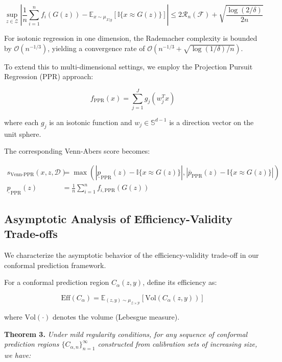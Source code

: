 \documentclass{article}
\theoremstyle{plain}
\theoremstyle{definition}
\theoremstyle{remark}
\begin{document}
\begin{equation}
\sup_{z \in \mathcal{Z}} \left| \frac{1}{n} \sum_{i=1}^n f_i(G(z)) - \mathbb{E}_{x \sim \mu_{\mathcal{X}|y}}[\mathbb{I}\{x \approx G(z)\}] \right| \leq 2\mathcal{R}_n(\mathcal{F}) + \sqrt{\frac{\log(2/\delta)}{2n}}
\end{equation}

For isotonic regression in one dimension, the Rademacher complexity is bounded by $\mathcal{O}(n^{-1/3})$, yielding a convergence rate of $\mathcal{O}(n^{-1/3} + \sqrt{\log(1/\delta)/n})$.

To extend this to multi-dimensional settings, we employ the Projection Pursuit Regression (PPR) approach:

\begin{equation}
f_{\text{PPR}}(x) = \sum_{j=1}^J g_j(w_j^T x)
\end{equation}

where each $g_j$ is an isotonic function and $w_j \in \mathbb{S}^{d-1}$ is a direction vector on the unit sphere.

The corresponding Venn-Abers score becomes:

\begin{align}
s_{\text{Venn-PPR}}(x, z, \mathcal{D}) &= \max(|\underline{p}_{\text{PPR}}(z) - \mathbb{I}\{x \approx G(z)\}|, |\overline{p}_{\text{PPR}}(z) - \mathbb{I}\{x \approx G(z)\}|) \\
\underline{p}_{\text{PPR}}(z) &= \frac{1}{n} \sum_{i=1}^n f_{i,\text{PPR}}(G(z))
\end{align}

\subsection{Asymptotic Analysis of Efficiency-Validity Trade-offs}

We characterize the asymptotic behavior of the efficiency-validity trade-off in our conformal prediction framework.

For a conformal prediction region $C_{\alpha}(z, y)$, define its efficiency as:

\begin{equation}
\text{Eff}(C_{\alpha}) = \mathbb{E}_{(z,y) \sim \mu_{\mathcal{Z} \times \mathcal{Y}}}[\text{Vol}(C_{\alpha}(z, y))]
\end{equation}

where $\text{Vol}(\cdot)$ denotes the volume (Lebesgue measure).

\textbf{Theorem 3.} \textit{Under mild regularity conditions, for any sequence of conformal prediction regions $\{C_{\alpha,n}\}_{n=1}^{\infty}$ constructed from calibration sets of increasing size, we have:}
\end{document}
